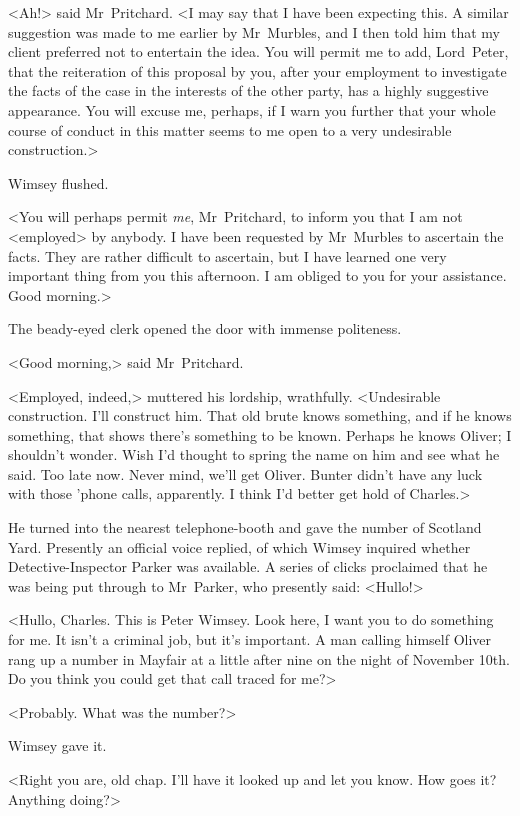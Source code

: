 <Ah!> said Mr~Pritchard. <I may say that I have been expecting this. A similar suggestion was made to me earlier by Mr~Murbles, and I then told him that my client preferred not to entertain the idea. You will permit me to add, Lord~Peter, that the reiteration of this proposal by you, after your employment to investigate the facts of the case in the interests of the other party, has a highly suggestive appearance. You will excuse me, perhaps, if I warn you further that your whole course of conduct in this matter seems to me open to a very undesirable construction.>

Wimsey flushed.

<You will perhaps permit \emph{me}, Mr~Pritchard, to inform you that I am not <employed> by anybody. I have been requested by Mr~Murbles to ascertain the facts. They are rather difficult to ascertain, but I have learned one very important thing from you this afternoon. I am obliged to you for your assistance. Good morning.>

The beady-eyed clerk opened the door with immense politeness.

<Good morning,> said Mr~Pritchard.

<Employed, indeed,> muttered his lordship, wrathfully. <Undesirable construction. I'll construct him. That old brute knows something, and if he knows something, that shows there's something to be known. Perhaps he knows Oliver; I shouldn't wonder. Wish I'd thought to spring the name on him and see what he said. Too late now. Never mind, we'll get Oliver. Bunter didn't have any luck with those 'phone calls, apparently. I think I'd better get hold of Charles.>

He turned into the nearest telephone-booth and gave the number of Scotland Yard. Presently an official voice replied, of which Wimsey inquired whether Detective-Inspector Parker was available. A series of clicks proclaimed that he was being put through to Mr~Parker, who presently said: <Hullo!>

<Hullo, Charles. This is Peter Wimsey. Look here, I want you to do something for me. It isn't a criminal job, but it's important. A man calling himself Oliver rang up a number in Mayfair at a little after nine on the night of November 10th. Do you think you could get that call traced for me?>

<Probably. What was the number?>

Wimsey gave it.

<Right you are, old chap. I'll have it looked up and let you know. How goes it? Anything doing?>

